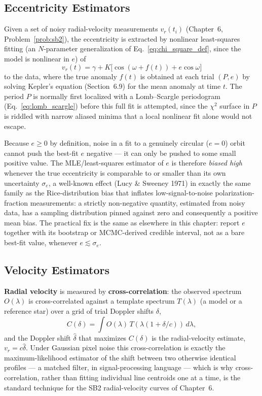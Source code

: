 \subsection{Eccentricity Estimators}
\label{sec:eccentricity_estimator}

Given a set of noisy radial-velocity measurements $v_r(t_i)$ (Chapter~6, Problem~\ref{prob:sb2}), the eccentricity is extracted by nonlinear least-squares fitting (an $N$-parameter generalization of Eq.~\eqref{eq:chi_square_def}, since the model is nonlinear in $e$) of
\[
v_r(t) = \gamma + K\big[\cos(\omega+f(t))+e\cos\omega\big]
\]
to the data, where the true anomaly $f(t)$ is obtained at each trial $(P,e)$ by solving Kepler's equation (Section~6.9) for the mean anomaly at time $t$. The period $P$ is normally first localized with a Lomb--Scargle periodogram (Eq.~\eqref{eq:lomb_scargle}) before this full fit is attempted, since the $\chi^2$ surface in $P$ is riddled with narrow aliased minima that a local nonlinear fit alone would not escape.

\begin{tcolorbox}[flagbox, title=A FAMOUS ESTIMATOR BIAS: THE LUCY--SWEENEY EFFECT]
	Because $e\ge0$ by definition, noise in a fit to a genuinely circular ($e=0$) orbit cannot push the best-fit $e$ negative --- it can only be pushed to some small positive value. The MLE/least-squares estimator of $e$ is therefore \emph{biased high} whenever the true eccentricity is comparable to or smaller than its own uncertainty $\sigma_e$, a well-known effect (Lucy \& Sweeney 1971) in exactly the same family as the Rice-distribution bias that inflates low-signal-to-noise polarization-fraction measurements: a strictly non-negative quantity, estimated from noisy data, has a sampling distribution pinned against zero and consequently a positive mean bias. The practical fix is the same as elsewhere in this chapter: report $e$ together with its bootstrap or MCMC-derived credible interval, not as a bare best-fit value, whenever $e\lesssim\sigma_e$.
\end{tcolorbox}

\subsection{Velocity Estimators}

\textbf{Radial velocity} is measured by \textbf{cross-correlation}: the observed spectrum $O(\lambda)$ is cross-correlated against a template spectrum $T(\lambda)$ (a model or a reference star) over a grid of trial Doppler shifts $\delta$,
\[
C(\delta) = \int O(\lambda)\,T(\lambda(1+\delta/c))\,d\lambda,
\]
and the Doppler shift $\hat\delta$ that maximizes $C(\delta)$ is the radial-velocity estimate, $v_r=c\hat\delta$. Under Gaussian pixel noise this cross-correlation is exactly the maximum-likelihood estimator of the shift between two otherwise identical profiles --- a matched filter, in signal-processing language --- which is why cross-correlation, rather than fitting individual line centroids one at a time, is the standard technique for the SB2 radial-velocity curves of Chapter~6.

